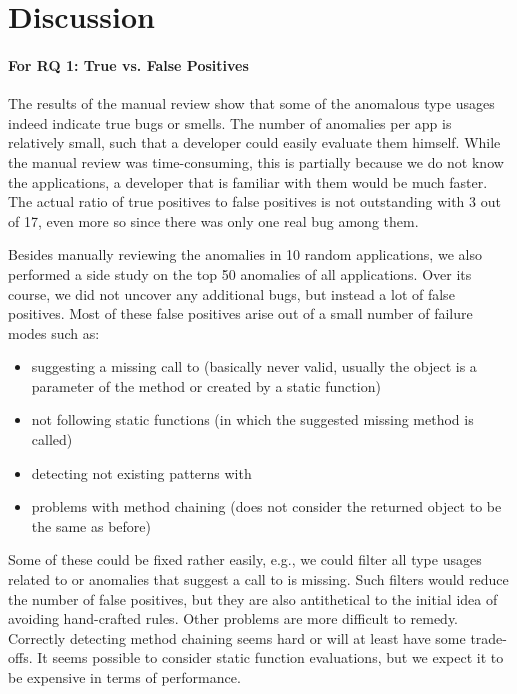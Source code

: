 \section{Discussion}\label{sc:disc}

\paragraph{For RQ 1: True vs. False Positives}

The results of the manual review show that some of the anomalous type usages indeed indicate true bugs or smells.
The number of anomalies per app is relatively small, such that a developer could easily evaluate them himself.
While the manual review was time-consuming, this is partially because we do not know the applications, a developer that is familiar with them would be much faster.
The actual ratio of true positives to false positives is not outstanding with 3 out of 17, even more so since there was only one real bug among them.

Besides manually reviewing the anomalies in 10 random applications, we also performed a side study on the top 50 anomalies of all applications.
Over its course, we did not uncover any additional bugs, but instead a lot of false positives.
Most of these false positives arise out of a small number of failure modes such as:
\begin{itemize}
    \item suggesting a missing call to  (basically never valid, usually the object is a parameter of the method or created by a static function)
    \item not following static functions (in which the suggested missing method is called)
    \item detecting not existing patterns with 
    \item problems with method chaining (does not consider the returned object to be the same as before)
\end{itemize}
Some of these could be fixed rather easily, e.g., we could filter all type usages related to  or anomalies that suggest a call to  is missing.
Such filters would reduce the number of false positives, but they are also antithetical to the initial idea of avoiding hand-crafted rules.
Other problems are more difficult to remedy.
Correctly detecting method chaining seems hard or will at least have some trade-offs.
It seems possible to consider static function evaluations, but we expect it to be expensive in terms of performance.

